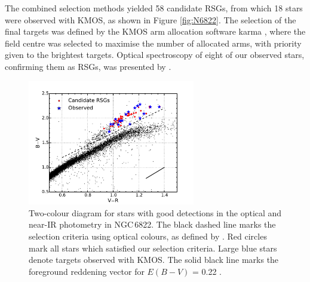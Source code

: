 The combined selection methods yielded 58 candidate RSGs, from which 18 stars were observed with KMOS, as shown in Figure
\ref{fig:N6822}.
The selection of the final targets was defined by the KMOS arm allocation software {\sc karma}
\citep{2008SPIE.7019E..0TW},
where the field centre was selected to maximise the number of allocated arms,
with priority given to the brightest targets.
Optical spectroscopy of eight of our observed stars, confirming them as RSGs, was presented by
\cite{2012AJ....144....2L}.


\begin{figure}
 \centering
 \includegraphics[width=0.65\textwidth]{ngc6822/N6822_bvr}
 \caption{
          Two-colour diagram for stars with good detections in the optical and near-IR photometry in NGC\,6822.
          The black dashed line marks the selection criteria using optical colours, as defined by
          \protect\cite{2012AJ....144....2L}.
          Red circles mark all stars which satisfied our selection criteria.
          Large blue stars denote targets observed with KMOS.
          The solid black line marks the foreground reddening vector for $E(B-V)$ = 0.22
          \protect\citep{1998ApJ...500..525S}.
         }
 \label{fig:BVR}
\end{figure}

